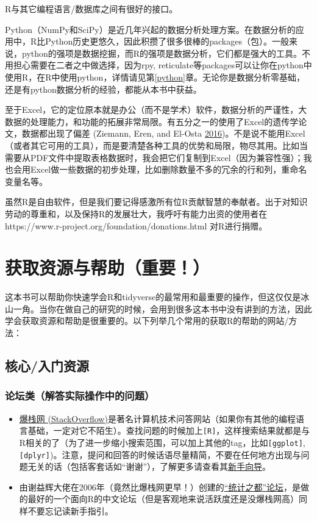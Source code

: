 \documentclass[]{book}
\providecommand{\tightlist}{%
  \setlength{\itemsep}{0pt}\setlength{\parskip}{0pt}}
\begin{document}
R与其它编程语言/数据库之间有很好的接口。

Python（NumPy和SciPy）是近几年兴起的数据分析处理方案。在数据分析的应用中，R比Python历史更悠久，因此积攒了很多很棒的packages（包）。一般来说，python的强项是数据挖掘，而R的强项是数据分析，它们都是强大的工具。不用担心需要在二者之中做选择，因为rpy, reticulate等packages可以让你在python中使用R，在R中使用python，详情请见第\ref{python}章。无论你是数据分析零基础，还是有python数据分析的经验，都能从本书中获益。

至于Excel，它的定位原本就是办公（而不是学术）软件，数据分析的严谨性，大数据的处理能力，和功能的拓展非常局限。有五分之一的使用了Excel的遗传学论文，数据都出现了偏差 (Ziemann, Eren, and El-Osta \protect\hyperlink{ref-Ziemann2016Gene-name-errors}{2016})。不是说不能用Excel（或者其它可用的工具），而是要清楚各种工具的优势和局限，物尽其用。比如当需要从PDF文件中提取表格数据时，我会把它们复制到Excel（因为兼容性强）；我也会用Excel做一些数据的初步处理，比如删除数量不多的冗余的行和列，重命名变量名等。

虽然R是自由软件，但是我们要记得感激所有位R贡献智慧的奉献者。出于对知识劳动的尊重和，以及保持R的发展壮大，我呼吁有能力出资的使用者在https://www.r-project.org/foundation/donations.html 对R进行捐赠。

\hypertarget{getting-help}{%
\section{获取资源与帮助（重要！）}\label{getting-help}}

这本书可以帮助你快速学会R和tidyverse的最常用和最重要的操作，但这仅仅是冰山一角。当你在做自己的研究的时候，会用到很多这本书中没有讲到的方法，因此学会获取资源和帮助是很重要的。以下列举几个常用的获取R的帮助的网站/方法：

\subsection{核心/入门资源}

\hypertarget{forum}{%
\subsubsection{论坛类（解答实际操作中的问题）}\label{forum}}

\begin{itemize}
\tightlist
\item
  \href{https://stackoverflow.com}{爆栈网 (StackOverflow)}是著名计算机技术问答网站（如果你有其他的编程语言基础，一定对它不陌生）。查找问题的时候加上\texttt{{[}R{]}}，这样搜索结果就都是与R相关的了（为了进一步缩小搜索范围，可以加上其他的tag，比如\texttt{{[}ggplot{]}}, \texttt{{[}dplyr{]}})。注意，提问和回答的时候话语尽量精简，不要在任何地方出现与问题无关的话（包括客套话如``谢谢''），了解更多请查看其\href{https://stackoverflow.com/tour}{新手向导}。
\item
  由谢益辉大佬在2006年（竟然比爆栈网更早！）创建的\href{https://d.cosx.org}{``统计之都''论坛}，是做的最好的一个面向R的中文论坛（但是客观地来说活跃度还是没爆栈网高）同样不要忘记读新手指引。
\end{itemize}
\end{document}
